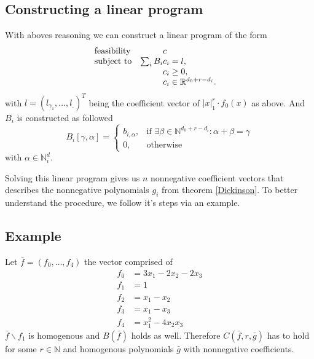 \documentclass[./main.tex]{subfiles}
\begin{document}
\subsection{Constructing a linear program}
With aboves reasoning we can construct a linear program of the form
\begin{equation*}
\begin{array}{ll@{}ll}
\text{feasibility}  & &c &\\
\text{subject to}& \sum_i B_i &c_i = l,  &\\
& &c_i \geq 0,  &\\
                 &&c_i \in \mathbb{R}^{d_0+r-d_i}.              
\end{array}
\end{equation*}
with $l = (l_{\gamma_1},\dots,l_{.})^T$ being the coefficient vector of $\vert x \vert_1^r \cdot f_0(x)$ as above. And $B_i$ is constructed as followed
\begin{equation*}
B_i[\gamma,\alpha]    = \begin{cases}
    b_{i,\alpha},& \text{if } \exists \beta \in \mathbb{N}^{d_0+r-d_i} : \alpha + \beta = \gamma\\
    0,              & \text{otherwise}
\end{cases}
\end{equation*}
with $\alpha \in \mathbb{N}^d_i$. 

Solving this linear program gives us $n$ nonnegative coefficient vectors that describes the nonnegative polynomials $g_i$ from theorem \ref{Dickinson}. To better understand the procedure, we follow it's steps via an example.

\subsection{Example}
Let $\bar{f}=(f_0,\dots,f_4)$ the vector comprised of 
\begin{align*}
f_0 &= 3x_1 -2x_2 -2x_3 \\
f_1 &= 1\\
f_2 &= x_1 -x_2\\
f_3 &= x_1 -x_3\\
f_4 &= x_1^2 -4x_2x_3
\end{align*}
$\bar{f}\backslash f_1$ is homogenous and $B(\bar{f})$ holds as well. Therefore $C(\bar{f},r,\bar{g})$ has to hold for some $r\in \mathbb{N}$ and homogenous polynomials $\bar{g}$ with nonnegative coefficients. 
\end{document}
